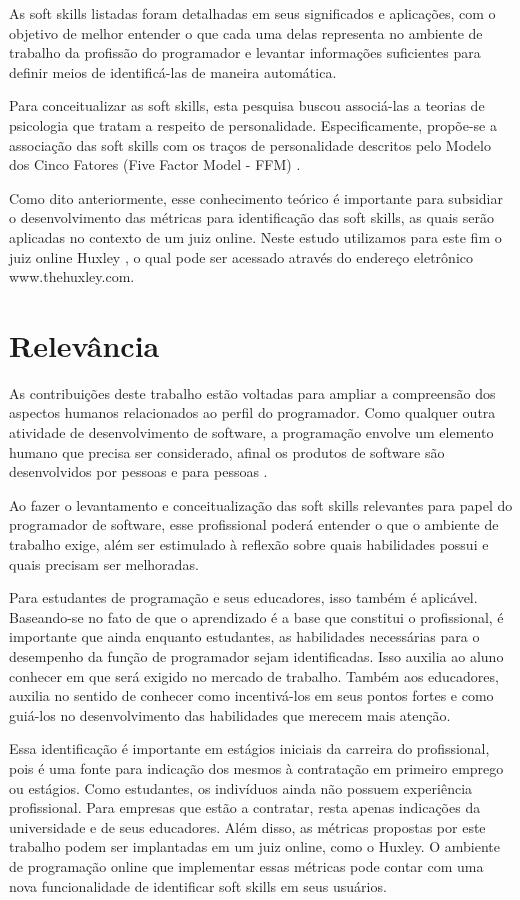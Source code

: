 As soft skills listadas foram detalhadas em seus significados e aplicações, com o objetivo de melhor entender o que cada uma delas representa no ambiente de trabalho da profissão do programador e levantar informações suficientes para definir meios de identificá-las de maneira automática.

Para conceitualizar as soft skills, esta pesquisa buscou associá-las a teorias de psicologia que tratam a respeito de personalidade. Especificamente, propõe-se a associação das soft skills com os traços de personalidade descritos pelo Modelo dos Cinco Fatores (Five Factor Model - FFM) \cite{mccrae:92}. 

Como dito anteriormente, esse conhecimento teórico é importante para subsidiar o desenvolvimento das métricas para identificação das soft skills, as quais serão aplicadas no contexto de um juiz online. Neste estudo utilizamos para este fim o juiz online Huxley \cite{paes:13}, o qual pode ser acessado através do endereço eletrônico www.thehuxley.com.

\section{Relevância}

As contribuições deste trabalho estão voltadas para ampliar a compreensão dos aspectos humanos relacionados ao perfil do programador. Como qualquer outra atividade de desenvolvimento de software, a programação envolve um elemento humano que precisa ser considerado, afinal os produtos de software são desenvolvidos por pessoas e para pessoas \cite{john:05}.

Ao fazer o levantamento e conceitualização das soft skills relevantes para papel do programador de software, esse profissional poderá entender o que o ambiente de trabalho exige, além ser estimulado à reflexão sobre quais habilidades possui e quais precisam ser melhoradas.

Para estudantes de programação e seus educadores, isso também é aplicável. Baseando-se no fato de que o aprendizado é a base que constitui o profissional, é importante que ainda enquanto estudantes, as habilidades necessárias para o desempenho da função de programador sejam identificadas. Isso auxilia ao aluno conhecer em que será exigido no mercado de trabalho. Também aos educadores, auxilia no sentido de conhecer como incentivá-los em seus pontos fortes e como guiá-los no desenvolvimento das habilidades que merecem mais atenção.

Essa identificação é importante em estágios iniciais da carreira do profissional, pois é uma fonte para indicação dos mesmos à contratação em primeiro emprego ou estágios. Como estudantes, os indivíduos ainda não possuem experiência profissional. Para empresas que estão a contratar, resta apenas indicações da universidade e de seus educadores.
Além disso, as métricas propostas por este trabalho podem ser implantadas em um juiz online, como o Huxley. O ambiente de programação online que implementar essas métricas pode contar com uma nova funcionalidade de identificar soft skills em seus usuários.

